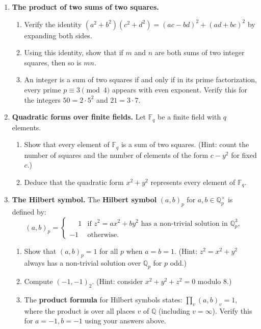 \begin{enumerate}
    \item \textbf{The product of two sums of two squares.}
    \begin{enumerate}
        \item Verify the identity $(a^2+b^2)(c^2+d^2) = (ac-bd)^2 + (ad+bc)^2$ by expanding both sides.
        \item Using this identity, show that if $m$ and $n$ are both sums of two integer squares, then so is $mn$.
        \item An integer is a sum of two squares if and only if in its prime factorization, every prime $p \equiv 3 \pmod{4}$ appears with even exponent. Verify this for the integers $50 = 2 \cdot 5^2$ and $21 = 3 \cdot 7$.
    \end{enumerate}

    \item \textbf{Quadratic forms over finite fields.} Let $\mathbb{F}_q$ be a finite field with $q$ elements.
    \begin{enumerate}
        \item Show that every element of $\mathbb{F}_q$ is a sum of two squares. (Hint: count the number of squares and the number of elements of the form $c - y^2$ for fixed $c$.)
        \item Deduce that the quadratic form $x^2 + y^2$ represents every element of $\mathbb{F}_q$.
    \end{enumerate}

    \item[$\star$] \textbf{The Hilbert symbol.} The \textbf{Hilbert symbol} $(a, b)_p$ for $a, b \in \mathbb{Q}_p^\times$ is defined by:
    \[
        (a, b)_p = \begin{cases} \phantom{-}1 & \text{if } z^2 = ax^2 + by^2 \text{ has a non-trivial solution in } \mathbb{Q}_p^3, \\ -1 & \text{otherwise.} \end{cases}
    \]
    \begin{enumerate}
        \item Show that $(a, b)_p = 1$ for all $p$ when $a = b = 1$. (Hint: $z^2 = x^2 + y^2$ always has a non-trivial solution over $\mathbb{Q}_p$ for $p$ odd.)
        \item Compute $(-1, -1)_2$. (Hint: consider $x^2 + y^2 + z^2 = 0$ modulo 8.)
        \item The \textbf{product formula} for Hilbert symbols states: $\prod_v (a, b)_v = 1$, where the product is over all places $v$ of $\mathbb{Q}$ (including $v = \infty$). Verify this for $a = -1, b = -1$ using your answers above.
    \end{enumerate}


\end{enumerate}
